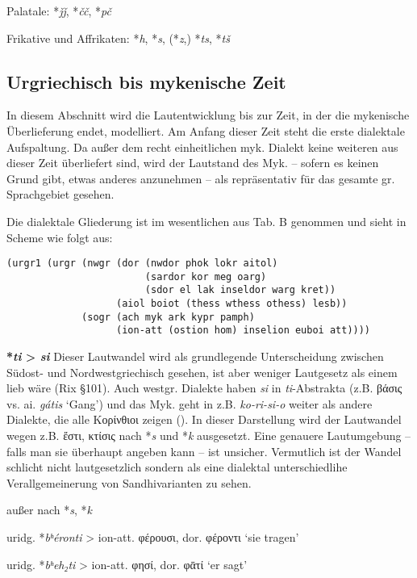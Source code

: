 \documentclass[12pt,a4paper,normalheadings]{scrartcl}
\newcounter{para}
\newcommand{\mypara}[1]{\vspace{1em}\par\noindent\refstepcounter{para}%
\textbf{\textsf{\thepara}}\enspace\textbf{#1}\quad}
\def\rek#1{\mbox{*\textit{#1}}}
\def\bel#1{\mbox{\textit{#1}}}
\begin{document}
\noindent
Palatale: \rek{ǰǰ}, \rek{čč}, \rek{pč}

\noindent
Frikative und Affrikaten: \rek{h}, \rek{s}, (\rek{z},) \rek{ts}, \rek{tš}

\subsection{Urgriechisch bis mykenische Zeit}

In diesem Abschnitt wird die Lautentwicklung bis zur Zeit,
in der die mykenische Überlieferung endet, modelliert.
Am Anfang dieser Zeit steht die erste dialektale Aufspaltung.
Da außer dem recht einheitlichen myk. Dialekt keine weiteren aus dieser
Zeit überliefert sind,
wird der Lautstand des Myk.
-- sofern es keinen Grund gibt, etwas anderes anzunehmen --
als repräsentativ für das gesamte gr. Sprachgebiet gesehen.

Die dialektale Gliederung ist im wesentlichen aus \cite{bart_frueh}
Tab. B genommen und sieht in Scheme wie folgt aus:
\begin{verbatim}
(urgr1 (urgr (nwgr (dor (nwdor phok lokr aitol)
                        (sardor kor meg oarg)
                        (sdor el lak inseldor warg kret))
                   (aiol boiot (thess wthess othess) lesb))
             (sogr (ach myk ark kypr pamph)
                   (ion-att (ostion hom) inselion euboi att))))
\end{verbatim}

\mypara{\rek{ti} > \bel{si}}
Dieser Lautwandel wird als grundlegende Unterscheidung zwischen Südost-
und Nordwestgriechisch gesehen,
ist aber weniger Lautgesetz als einem lieb wäre (Rix §101).
Auch westgr. Dialekte haben \bel{si} in \emph{ti}-Abstrakta (z.B. βάσις vs. ai. \bel{gátis} `Gang')
und das Myk. geht in z.B. \bel{ko-ri-si-o} weiter als andere Dialekte,
die alle Κορίνθιοι zeigen (\cite[144]{bart_hand}).
In dieser Darstellung wird der Lautwandel wegen z.B. ἔστι, κτίσις
nach \rek{s} und \rek{k} ausgesetzt.
Eine genauere Lautumgebung -- falls man sie überhaupt angeben kann --
ist unsicher.
Vermutlich ist der Wandel schlicht nicht lautgesetzlich
sondern als eine dialektal unterschiedlihe
Verallgemeinerung von Sandhivarianten zu sehen.

\lex{\rek{t}}{\rek{s}}{\_i} außer nach \rek{s}, \rek{k}

uridg. \rek{bʰéronti} > ion-att. φέρουσι, dor. φέροντι `sie tragen'

uridg. \rek{bʰeh₂ti} > ion-att. φησί, dor. φᾱτί `er sagt'
\end{document}
